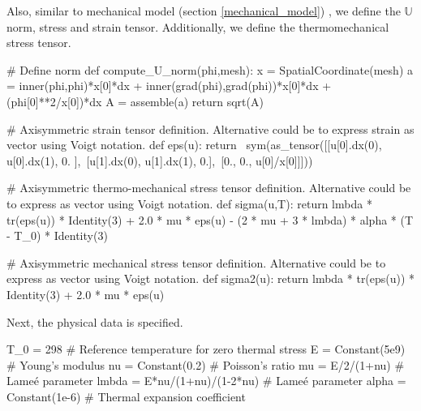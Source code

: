 Also, similar to mechanical model (section \ref{mechanical_model}) , we define the $\mathbb{U}$ norm, stress and strain tensor. Additionally, we define the thermomechanical stress tensor. 
\begin{python}
# Define  norm
def compute_U_norm(phi,mesh):
	x = SpatialCoordinate(mesh)
	a = inner(phi,phi)*x[0]*dx + inner(grad(phi),grad(phi))*x[0]*dx + (phi[0]**2/x[0])*dx
	A = assemble(a)
	return sqrt(A)

# Axisymmetric strain tensor definition. Alternative could be to express strain as vector using Voigt notation.
def eps(u):
	return \
		sym(as_tensor([[u[0].dx(0), u[0].dx(1), 0. ],\
		[u[1].dx(0), u[1].dx(1), 0.],\
		[0., 0., u[0]/x[0]]]))

# Axisymmetric thermo-mechanical stress tensor definition. Alternative could be to express as vector using Voigt notation.
def sigma(u,T):
	return lmbda * tr(eps(u)) * Identity(3) + 2.0 * mu * eps(u) - (2 * mu + 3 * lmbda) * alpha * (T - T_0) * Identity(3)

# Axisymmetric mechanical stress tensor definition. Alternative could be to express as vector using Voigt notation.
def sigma2(u):
	return lmbda * tr(eps(u)) * Identity(3) + 2.0 * mu * eps(u)
\end{python}

Next, the physical data is specified.

\begin{python}
T_0 = 298 # Reference temperature for zero thermal stress
E = Constant(5e9) # Young's modulus
nu = Constant(0.2) # Poisson's ratio
mu = E/2/(1+nu) # Lame\'e parameter
lmbda = E*nu/(1+nu)/(1-2*nu) # Lame\'e parameter
alpha = Constant(1e-6) # Thermal expansion coefficient
\end{python}

